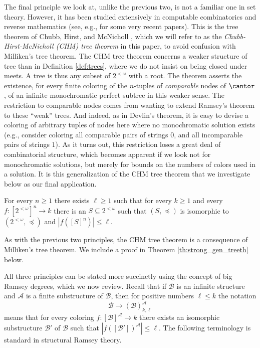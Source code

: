 The final principle we look at, unlike the previous two, is not a familiar one in set theory. However, it has been studied extensively in computable combinatorics and reverse mathematics (see, e.g., \cite{Chong2019Strengtha, Chong2019Strengthb, Chong2019Strengthc, Dzhafarov2017Coloring, Patey2016strength} for some very recent papers). This is the tree theorem of Chubb, Hirst, and McNicholl \cite{Chubb2009Reverse}, which we will refer to as the \emph{Chubb-Hirst-McNicholl (CHM) tree theorem} in this paper, to avoid confusion with Milliken's tree theorem. The CHM tree theorem concerns a weaker structure of tree than in Definition \ref{def:trees}, where we do not insist on being closed under meets. A tree is thus any subset of $2^{<\omega}$ with a root. The theorem asserts the existence, for every finite coloring of the $n$-tuples of \emph{comparable} nodes of $\cantor$, of an infinite monochromatic perfect subtree in this weaker sense. The restriction to comparable nodes comes from wanting to extend Ramsey's theorem to these ``weak'' trees. And indeed, as in Devlin's theorem, it is easy to devise a coloring of arbitrary tuples of nodes here where no monochromatic solution exists (e.g., consider coloring all comparable pairs of strings $0$, and all incomparable pairs of strings $1$). As it turns out, this restriction loses a great deal of combinatorial structure, which becomes apparent if we look not for monochromatic solutions, but merely for bounds on the numbers of colors used in a solution. It is this generalization of the CHM tree theorem that we investigate below as our final application.

\begin{theorem}
	For every $n \geq 1$ there exists $\ell \geq 1$ such that for every $k \geq 1$ and every $f : [2^{<\omega}]^n \to k$ there is an $S \subseteq 2^{<\omega}$ such that $(S,\preceq)$ is isomorphic to $(2^{<\omega},\preceq)$ and $|f ([S]^n)| \leq \ell$.
\end{theorem}

\noindent As with the previous two principles, the CHM tree theorem is a consequence of Milliken's tree theorem. We include a proof in Theorem \ref{th:strong_gen_treeth} below.

All three principles can be stated more succinctly using the concept of big Ramsey degrees, which we now review. Recall that if $\mathcal{B}$ is an infinite structure and $\mathcal{A}$ is a finite substructure of $\mathcal{B}$, then for positive numbers $\ell \leq k$ the notation
\[
\mathcal{B} \to (\mathcal{B})^{\mathcal{A}}_{k,\ell}
\]
means that for every coloring $f : [\mathcal{B}]^\mathcal{A} \to k$ there exists an isomorphic substructure $\mathcal{B}'$ of $\mathcal{B}$ such that $|f([\mathcal{B}'])^\mathcal{A}| \leq \ell$. The following terminology is standard in structural Ramsey theory.

